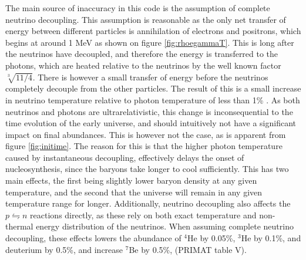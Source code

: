 The main source of inaccuracy in this code is the assumption of complete neutrino decoupling. This assumption is reasonable as the only net transfer of energy between different particles is annihilation of electrons and positrons, which begins at around 1 MeV as shown on figure \ref{fig:rhoegammaT}. This is long after the neutrinos have decoupled, and therefore the energy is transferred to the photons, which are heated relative to the neutrinos by the well known factor $\sqrt[3]{11/4}$. There is however a small transfer of energy before the neutrinos completely decouple from the other particles. The result of this is a small increase in neutrino temperature relative to photon temperature of less than 1\% \cite{Hannestad:1995rs}. As both neutrinos and photons are ultrarelativistic, this change is inconsequential to the time evolution of the early universe, and should intuitively not have a significant impact on final abundances. This is however not the case, as is apparent from figure \ref{fig:initime}. The reason for this is that the higher photon temperature caused by instantaneous decoupling, effectively delays the onset of nucleosynthesis, since the baryons take longer to cool sufficiently. This has two main effects, the first being slightly lower baryon density at any given temperature, and the second that the universe will remain in any given temperature range for longer. Additionally, neutrino decoupling also affects the $p\leftrightharpoons n$ reactions directly, as these rely on both exact temperature and non-thermal energy distribution of the neutrinos. When assuming complete neutrino decoupling, these effects lowers the abundance of ${}^4$He by 0.05\%, ${}^3$He by 0.1\%, and deuterium by 0.5\%, and increase ${}^7$Be by 0.5\%, (PRIMAT table V\cite{PRIMAT}). 


